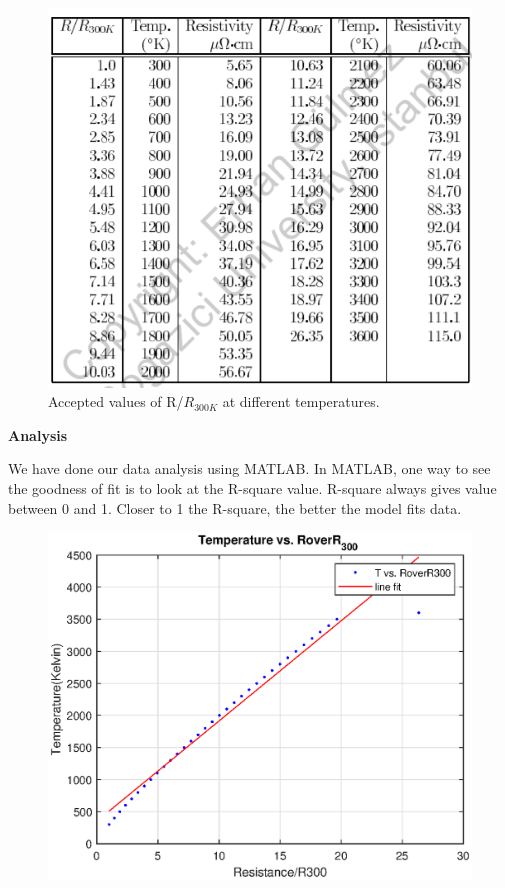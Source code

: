 \documentclass[11pt,a4paper]{article}
\begin{document}
{\begin{figure}[H]
\begin{center}
        		\includegraphics[scale=0.6]{R.png}
        	\end{center}
        \caption{Accepted values of R/$R_{300K}$ at different temperatures.}
        \end{figure} \newpage 
        \textbf{Analysis}\\[\baselineskip]
        \par We have done our data analysis using MATLAB. In MATLAB, one way to see the goodness of fit is to look at the R-square value. R-square always gives value between 0 and 1. Closer to 1 the R-square, the better the model fits data.
        \begin{figure}[H]
        	\begin{center}
        		\includegraphics[scale=0.7]{RR.eps}

\end{center}
\end{figure}}
\end{document}
